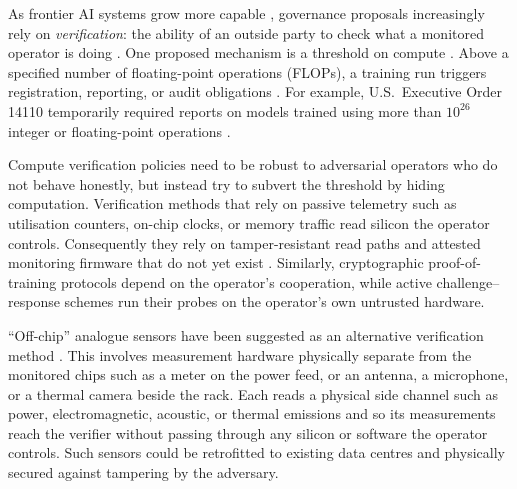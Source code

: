 \documentclass{article}
\theoremstyle{plain}
\theoremstyle{definition}
\theoremstyle{remark}
\begin{document}
As frontier AI systems grow more capable
\citep{sevilla2022compute,bengio2026safetyreport}, governance proposals increasingly
rely on \emph{verification}: the ability of an outside party to check what a
monitored operator is doing \citep{reuel2025openproblems,baker2025verifying}. One proposed mechanism is a threshold on compute
\citep{sastry2024computing}. Above a specified number of floating-point
operations (FLOPs), a training run triggers registration, reporting, or audit
obligations \citep{shavit2023chinchilla,baker2025verifying,heim2024thresholds}. For example, U.S.~Executive Order 14110 temporarily required reports on models
trained using more than $10^{26}$ integer or floating-point operations
\citep{whitehouse2023eo14110,whitehouse2025eo14148}.


Compute verification policies need to be robust to adversarial
operators who do not behave honestly, but instead try to subvert the
threshold by hiding computation. Verification methods that rely on passive telemetry such as utilisation counters, on-chip clocks, or memory traffic read silicon the
operator controls.
Consequently they rely on  tamper-resistant read paths and attested
monitoring firmware that do not yet exist
\citep{ogara2025hardware,ansari2026hardware,rahman2026telemetry}.
Similarly, cryptographic proof-of-training protocols
\citep{jia2021proofoflearning,garg2023zkpot} depend on the operator's
cooperation, while active challenge--response schemes \citep{monfared2026timing}
run their probes on the operator's own untrusted hardware.

``Off-chip'' analogue sensors have been suggested as an alternative verification method
\citep{baker2025verifying}. This involves measurement hardware physically separate from
the monitored chips such as a meter on the power feed, or an antenna, a microphone, or a thermal camera beside the
rack. Each
reads a physical side channel such as power, electromagnetic, acoustic, or
thermal emissions and so its measurements reach the verifier without passing
through any silicon or software the operator controls. Such sensors could
be retrofitted to existing data centres and physically secured against
tampering by the adversary.
\end{document}
